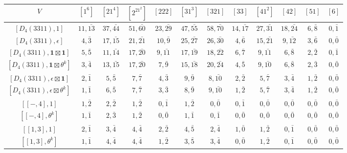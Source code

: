     \begin{table}[ht]
        \centering
        \begin{adjustbox}{max width=\linewidth}
        \begin{tabular}{|c|ccccccccccc|}
        \hline
        $V$ & $[1^6]$ & $[21^4]$ & $[2^21^2]$ & $[222]$ & $[31^3]$ & $[321]$ & $[33]$ & $[41^2]$ & $[42]$ & $[51]$ & $[6]$ \\ \hline

        $[D_4(3311), 1]$ & $11, \bar{13}$ & $37, \bar{44}$ & $51, \bar{60}$ & $23, \bar{29}$ & $47, \bar{55}$ & $58, \bar{70}$ & $14, \bar{17}$ & $27, \bar{31}$ & $18, \bar{24}$ & $6, \bar{8}$ & $0, \bar{1}$ \\ 
        $[D_4(3311), \epsilon]$ & $4, \bar{3}$ & $17, \bar{15}$ & $21, \bar{21}$ & $10, \bar{9}$ & $25, \bar{27}$ & $26, \bar{30}$ & $4, \bar{6}$ & $15, \bar{21}$ & $9, \bar{12}$ & $3, \bar{6}$ & $0, \bar{0}$ \\ \hline

        $[D_4(3311), \mathbf{1}\boxtimes\mathbf{1}]$ & $5, \bar{5}$ & $11, \bar{14}$ & $17, \bar{20}$ & $9, \bar{11}$ & $17, \bar{19}$ & $18, \bar{22}$ & $6, \bar{7}$ & $9, \bar{11}$ & $6, \bar{8}$ & $2, \bar{2}$ & $0, \bar{1}$ \\ 
        $[D_4(3311), \mathbf{1}\boxtimes\theta^k]$ & $3, \bar{4}$ & $13, \bar{15}$ & $17, \bar{20}$ & $7, \bar{9}$ & $15, \bar{18}$ & $20, \bar{24}$ & $4, \bar{5}$ & $9, \bar{10}$ & $6, \bar{8}$ & $2, \bar{3}$ & $0, \bar{0}$ \\ 
        $[D_4(3311), \epsilon\boxtimes\mathbf{1}]$ & $2, \bar{1}$ & $5, \bar{5}$ & $7, \bar{7}$ & $4, \bar{3}$ & $9, \bar{9}$ & $8, \bar{10}$ & $2, \bar{2}$ & $5, \bar{7}$ & $3, \bar{4}$ & $1, \bar{2}$ & $0, \bar{0}$ \\
        $[D_4(3311), \epsilon\boxtimes\theta^k]$ & $1, \bar{1}$ & $6, \bar{5}$ & $7, \bar{7}$ & $3, \bar{3}$ & $8, \bar{9}$ & $9, \bar{10}$ & $1, \bar{2}$ & $5, \bar{7}$ & $3, \bar{4}$ & $1, \bar{2}$ & $0, \bar{0}$ \\ \hline


        $[[-,4],1]$ & $1,\bar{2}$ & $2,\bar{2}$ & $1,\bar{2}$ & $0,\bar{1}$ & $1,\bar{2}$ & $0,\bar{0}$ & $0,\bar{1}$ & $0,\bar{0}$ & $0,\bar{0}$ & $0,\bar{0}$ & $0,\bar{0}$ \\ 
        $[[-,4],\theta^k]$ & $1,\bar{1}$ & $2,\bar{3}$ & $1,\bar{2}$ & $0,\bar{0}$ & $1,\bar{1}$ & $0,\bar{1}$ & $0,\bar{0}$ & $0,\bar{0}$ & $0,\bar{0}$ & $0,\bar{0}$ & $0,\bar{0}$ \\
        $[[1,3],1]$ & $2,\bar{1}$ & $3,\bar{4}$ & $4,\bar{4}$ & $2,\bar{2}$ & $4,\bar{5}$ & $2,\bar{4}$ & $1,\bar{0}$ & $1,\bar{2}$ & $0,\bar{1}$ & $0,\bar{0}$ & $0,\bar{0}$ \\
        $[[1,3],\theta^k]$ & $1,\bar{1}$ & $4,\bar{4}$ & $4,\bar{4}$ & $1,\bar{2}$ & $3,\bar{5}$ & $3,\bar{4}$ & $0,\bar{0}$ & $1,\bar{2}$ & $0,\bar{1}$ & $0,\bar{0}$ & $0,\bar{0}$ \\


\end{tabular}
\end{adjustbox}
\end{table}

